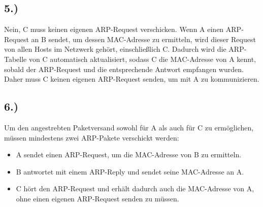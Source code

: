 \documentclass[a4paper]{scrartcl}
\begin{document}
\subsection*{5.)}

Nein, C muss keinen eigenen ARP-Request verschicken. Wenn A einen ARP-Request an B sendet, um dessen MAC-Adresse zu ermitteln, wird dieser Request von allen Hosts im Netzwerk gehört, einschließlich C. Dadurch wird die ARP-Tabelle von C automatisch aktualisiert, sodass C die MAC-Adresse von A kennt, sobald der ARP-Request und die entsprechende Antwort empfangen wurden. Daher muss C keinen eigenen ARP-Request senden, um mit A zu kommunizieren.

\subsection*{6.)}

Um den angestrebten Paketversand sowohl für A als auch für C zu ermöglichen, müssen mindestens zwei ARP-Pakete verschickt werden:

\begin{itemize}
  \item A sendet einen ARP-Request, um die MAC-Adresse von B zu ermitteln.
  \item B antwortet mit einem ARP-Reply und sendet seine MAC-Adresse an A.
  \item C hört den ARP-Request und erhält dadurch auch die MAC-Adresse von A, ohne einen eigenen ARP-Request senden zu müssen.
\end{itemize}
\end{document}
